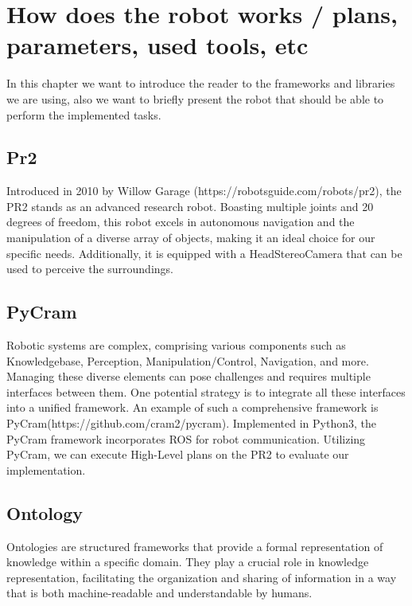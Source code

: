 \documentclass[	pdftex, 
								a4paper,
								11pt, DIV11, BCOR5mm,
								parskip,
								]{scrreprt}
\begin{document}
	

	\chapter*{How does the robot works / plans, parameters, used tools, etc}
	In this chapter we want to introduce the reader to the frameworks and libraries we are using, also we want to briefly present the robot that should be able to perform the implemented tasks.
	\section*{Pr2}
	Introduced in 2010 by Willow Garage (https://robotsguide.com/robots/pr2), the PR2 stands as an advanced research robot. Boasting multiple joints and 20 degrees of freedom, this robot excels in autonomous navigation and the manipulation of a diverse array of objects, making it an ideal choice for our specific needs. Additionally, it is equipped with a HeadStereoCamera that can be used to perceive the surroundings.
	\section*{PyCram}
	Robotic systems are complex, comprising various components such as Knowledgebase, Perception, Manipulation/Control, Navigation, and more. Managing these diverse elements can pose challenges and requires multiple interfaces between them. One potential strategy is to integrate all these interfaces into a unified framework. An example of such a comprehensive framework is PyCram(https://github.com/cram2/pycram).
	Implemented in Python3, the PyCram framework incorporates ROS for robot communication. Utilizing PyCram, we can execute High-Level plans on the PR2 to evaluate our implementation.
	\section*{Ontology}
	Ontologies are structured frameworks that provide a formal representation of knowledge within a specific domain. They play a crucial role in knowledge representation, facilitating the organization and sharing of information in a way that is both machine-readable and understandable by humans. 
\end{document}
